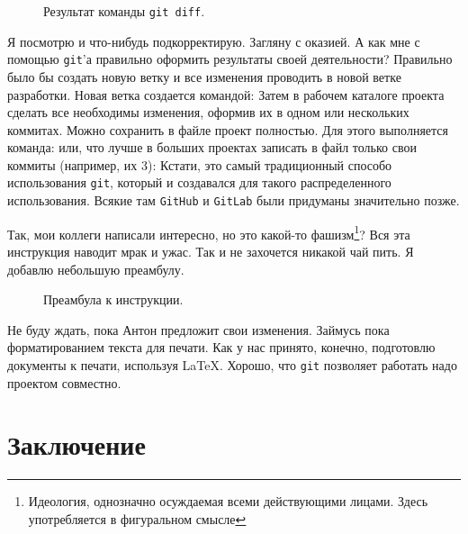 \documentclass[14pt,a4paper]{article}
\begin{document}
\begin{figure}
	\centering
	\caption{Результат команды \texttt{git diff}.}
	\label{pic-diff-result}
\end{figure}

 Я посмотрю и что-нибудь подкорректирую. Загляну с оказией. 
А как мне с помощью \texttt{git}'а правильно оформить результаты своей деятельности?
 Правильно было бы создать новую ветку и все изменения проводить 
в новой ветке разработки. Новая ветка создается командой:
Затем в рабочем каталоге проекта сделать все необходимы изменения, оформив их в одном
или нескольких коммитах. Можно сохранить в файле проект полностью. Для этого выполняется 
команда:
или, что лучше в больших проектах записать в файл только свои коммиты (например, их 3):
Кстати, это самый традиционный способо использования \texttt{git}, который и создавался
для такого распределенного использования. Всякие там \texttt{GitHub} и \texttt{GitLab}
были придуманы значительно позже.

 Так, мои коллеги написали интересно, но это какой-то
фашизм\footnote{Идеология, однозначно осуждаемая всеми действующими лицами. Здесь употребляется в
фигуральном смысле}? Вся эта инструкция наводит мрак и ужас. Так и не захочется никакой чай пить.
Я добавлю небольшую преамбулу.

\begin{figure}
	\centering
	\caption{Преамбула к инструкции.}
	\label{listing-preambula}
\end{figure}




 Не буду ждать, пока Антон предложит свои изменения. Займусь
пока форматированием текста для печати. Как у нас принято, конечно, подготовлю документы к печати,
используя \LaTeX. Хорошо, что \texttt{git} позволяет работать надо проектом совместно. 

 
\section{Заключение}
\end{document}

